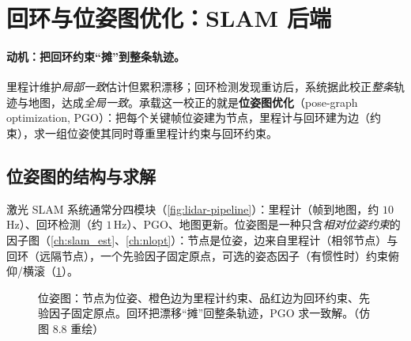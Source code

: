 \section{回环与位姿图优化：SLAM 后端}
\label{sec:lidar-loop}

\paragraph{动机：把回环约束“摊”到整条轨迹。}
里程计维护\emph{局部一致}估计但累积漂移；回环检测发现重访后，系统据此校正\emph{整条}轨迹与地图，达成\emph{全局一致}\cite{carlone2026handbook}。承载这一校正的就是\textbf{位姿图优化}（pose-graph optimization, PGO）：把每个关键帧位姿建为节点，里程计与回环建为边（约束），求一组位姿使其同时尊重里程计约束与回环约束。

\subsection{位姿图的结构与求解}
\label{sec:lidar-pgo}

激光 SLAM 系统通常分四模块（\cref{fig:lidar-pipeline}）\cite{carlone2026handbook}：里程计（帧到地图，约 $10$\,Hz）、回环检测（约 $1$\,Hz）、PGO、地图更新。位姿图是一种只含\emph{相对位姿约束}的因子图（\cref{ch:slam_est}、\cref{ch:nlopt}）：节点是位姿，边来自里程计（相邻节点）与回环（远隔节点），一个先验因子固定原点，可选的姿态因子（有惯性时）约束俯仰/横滚（\cref{fig:lidar-posegraph}）。

\begin{figure}[ht]
\centering
{}
\caption{位姿图：节点为位姿、橙色边为里程计约束、品红边为回环约束、先验因子固定原点。回环把漂移“摊”回整条轨迹，PGO 求一致解。（仿 \cite{carlone2026handbook} 图 8.8 重绘）}
\label{fig:lidar-posegraph}
\end{figure}

